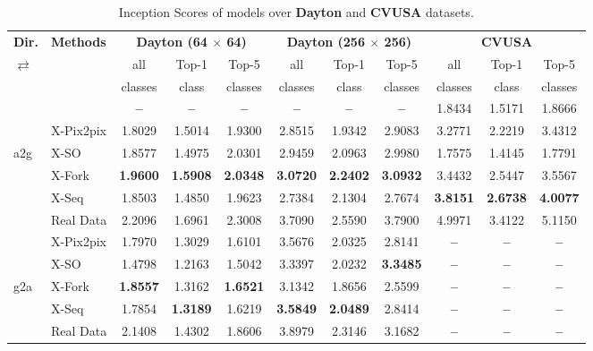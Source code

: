 \documentclass[times,twocolumn,final,authoryear]{elsarticle_modified}
\begin{document}
\begin{table*}[t]
\small
  \renewcommand{\arraystretch}{.7}
  \centering
  \caption{\small Inception Scores of models over {\bf Dayton} and {\bf CVUSA} datasets.}
  \vspace{-10pt}
  \label{tab:inception_score}
    \begin{tabular*}{\textwidth}{l @{\extracolsep{\fill}} lccccccccc}
        \toprule
              \multicolumn{1}{l}{\textbf{Dir.}} & \multicolumn{1}{l}{\textbf{Methods}} & \multicolumn{3}{c}{\textbf{Dayton (64 $\times$ 64)}} & \multicolumn{3}{c}{\textbf{Dayton (256 $\times$ 256)}} & \multicolumn{3}{c}{\textbf{CVUSA}}     \\
                \cmidrule(lr){3-5}
\cmidrule(lr){6-8} \cmidrule(lr){9-11}
       $\rightleftarrows$  & & all  & Top-1  & Top-5  & all  & Top-1  & Top-5  & all  & Top-1  & Top-5  \\
         & &  classes &  class &  classes &  classes &  class &  classes &  classes &  class &  classes \\
        \midrule
      &  \cite{zhai2017crossview} & \textbf{--} & \textbf{--} & \textbf{--} & \textbf{--} & \textbf{--} & \textbf{--} & 1.8434 & 1.5171 & 1.8666\\
      &  X-Pix2pix  & 1.8029 & 1.5014 & 1.9300 & 2.8515 & 1.9342 & 2.9083 & 3.2771 & 2.2219 & 3.4312 \\
   a2g &  X-SO & {1.8577} & {1.4975} & {2.0301} & {2.9459} & {2.0963} & {2.9980} & 1.7575 & 1.4145 & 1.7791 \\
    &  X-Fork & \textbf{1.9600} & \textbf{1.5908} & \textbf{2.0348} & \textbf{3.0720} & \textbf{2.2402} & \textbf{3.0932} & 3.4432 & 2.5447 & 3.5567\\
   &  X-Seq & 1.8503 & 1.4850 & 1.9623 & 2.7384 & 2.1304 & 2.7674 & \textbf{3.8151} & \textbf{2.6738} & \textbf{4.0077}\\
    \cmidrule(lr){2-11}
   &  Real Data & 2.2096 & 1.6961 & 2.3008 & 3.7090 & 2.5590 & 3.7900 & 4.9971 & 3.4122 & 5.1150\\
     \midrule
  &  X-Pix2pix  & 1.7970 & 1.3029 & 1.6101 & 3.5676 & 2.0325 & 2.8141 & \textbf{--} & \textbf{--} & \textbf{--} \\
   &   X-SO & 1.4798 & 1.2163 & 1.5042 & 3.3397 & 2.0232 & \textbf{3.3485} & \textbf{--} & \textbf{--} & \textbf{--}\\
 g2a  &   X-Fork & \textbf{1.8557} & {1.3162} & \textbf{1.6521} & 3.1342 & 1.8656 & 2.5599 & \textbf{--} & \textbf{--} & \textbf{--}\\
  &   X-Seq & 1.7854 & \textbf{1.3189} & 1.6219 & \textbf{3.5849} & \textbf{2.0489} & {2.8414} & \textbf{--} & \textbf{--} & \textbf{--}\\
    \cmidrule(lr){2-11}
  &   Real Data & 2.1408 & 1.4302 & 1.8606 & 3.8979 & 2.3146 & 3.1682 & \textbf{--} & \textbf{--} & \textbf{--}\\
        \bottomrule
    \end{tabular*}
\end{table*}
\end{document}
